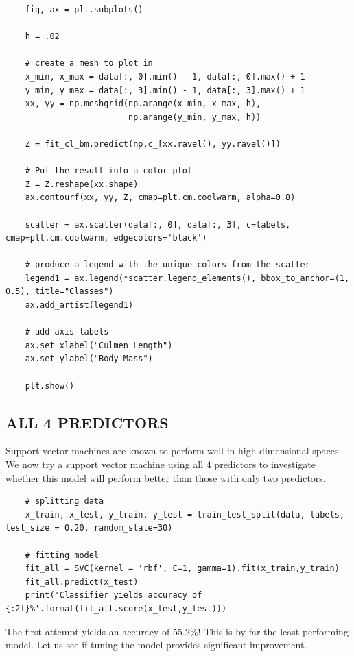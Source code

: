 \documentclass[12pt]{article}
\begin{document}
\begin{verbatim}
    fig, ax = plt.subplots()

    h = .02
    
    # create a mesh to plot in
    x_min, x_max = data[:, 0].min() - 1, data[:, 0].max() + 1
    y_min, y_max = data[:, 3].min() - 1, data[:, 3].max() + 1
    xx, yy = np.meshgrid(np.arange(x_min, x_max, h),
                         np.arange(y_min, y_max, h))
    
    Z = fit_cl_bm.predict(np.c_[xx.ravel(), yy.ravel()])
    
    # Put the result into a color plot
    Z = Z.reshape(xx.shape)
    ax.contourf(xx, yy, Z, cmap=plt.cm.coolwarm, alpha=0.8)
    
    scatter = ax.scatter(data[:, 0], data[:, 3], c=labels, cmap=plt.cm.coolwarm, edgecolors='black')
    
    # produce a legend with the unique colors from the scatter
    legend1 = ax.legend(*scatter.legend_elements(), bbox_to_anchor=(1, 0.5), title="Classes")
    ax.add_artist(legend1)
    
    # add axis labels
    ax.set_xlabel("Culmen Length")
    ax.set_ylabel("Body Mass")
    
    plt.show()    
\end{verbatim}

\subsection{ALL 4 PREDICTORS}

Support vector machines are known to perform well in high-dimensional spaces. We now try a support vector machine using all 4 predictors to investigate whether this model will perform better than those with only two predictors.

\begin{verbatim}
    # splitting data
    x_train, x_test, y_train, y_test = train_test_split(data, labels, test_size = 0.20, random_state=30)
    
    # fitting model
    fit_all = SVC(kernel = 'rbf', C=1, gamma=1).fit(x_train,y_train)
    fit_all.predict(x_test)
    print('Classifier yields accuracy of {:2f}%'.format(fit_all.score(x_test,y_test)))
\end{verbatim}

The first attempt yields an accuracy of 55.2\%! This is by far the least-performing model. Let us see if tuning the model provides significant improvement.
\end{document}
